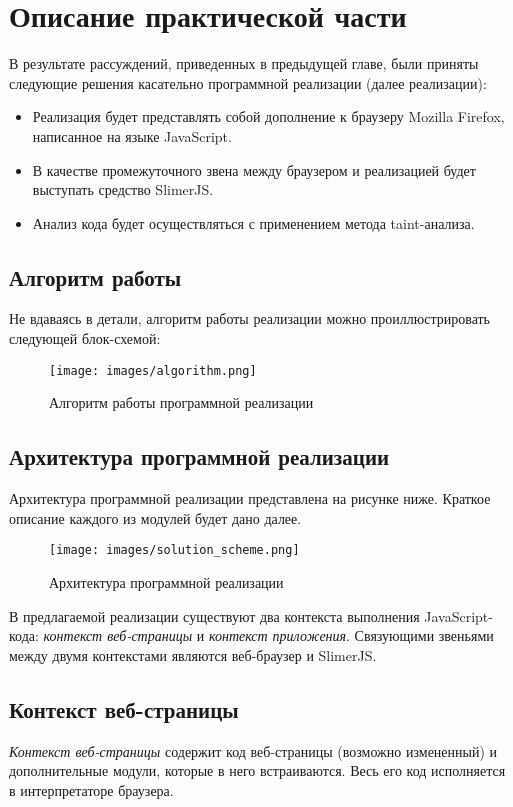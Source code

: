 
\chapter{Описание практической части}\label{Implementation}

В результате рассуждений, приведенных в предыдущей главе, были приняты следующие решения касательно программной реализации (далее реализации):

\begin{itemize}
	\item Реализация будет представлять собой дополнение к браузеру Mozilla Firefox, написанное на языке JavaScript.
	\item В качестве промежуточного звена между браузером и реализацией будет выступать средство SlimerJS.
	\item Анализ кода будет осуществляться с применением метода taint-анализа.
\end{itemize}

\section{Алгоритм работы}
Не вдаваясь в детали, алгоритм работы реализации можно проиллюстрировать следующей блок-схемой:

\begin{figure}
	\caption{Алгоритм работы программной реализации}
	\texttt{[image: images/algorithm.png]}
\end{figure}
\newpage


\section{Архитектура программной реализации}
Архитектура программной реализации представлена на рисунке ниже. Краткое описание каждого из модулей будет дано далее.

\bigskip
\begin{figure}[h]
	\caption{Архитектура программной реализации}
	\texttt{[image: images/solution\_scheme.png]}
\end{figure}
\bigskip

В предлагаемой реализации существуют два контекста выполнения JavaScript-кода: \textit{контекст веб-страницы} и \textit{контекст приложения}. Связующими звеньями между двумя контекстами являются веб-браузер и SlimerJS.

\section{Контекст веб-страницы}
\textit{Контекст веб-страницы} содержит код веб-страницы (возможно измененный) и дополнительные модули, которые в него встраиваются. Весь его код исполняется в интерпретаторе браузера. 


